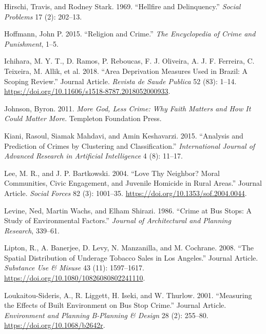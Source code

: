 \documentclass[smallextended]{svjour3}       %
\begin{document}
\leavevmode\hypertarget{ref-Hirschi1969hellfire}{}%
Hirschi, Travis, and Rodney Stark. 1969. ``Hellfire and Delinquency.''
\emph{Social Problems} 17 (2): 202--13.

\leavevmode\hypertarget{ref-Hoffmann2015religion}{}%
Hoffmann, John P. 2015. ``Religion and Crime.'' \emph{The Encyclopedia
of Crime and Punishment}, 1--5.

\leavevmode\hypertarget{ref-Ichihara2018area}{}%
Ichihara, M. Y. T., D. Ramos, P. Reboucas, F. J. Oliveira, A. J. F.
Ferreira, C. Teixeira, M. Allik, et al. 2018. ``Area Deprivation
Measures Used in Brazil: A Scoping Review.'' Journal Article.
\emph{Revista de Saude Publica} 52 (83): 1--14.
\url{https://doi.org/10.11606/s1518-8787.2018052000933}.

\leavevmode\hypertarget{ref-Johnson2011more}{}%
Johnson, Byron. 2011. \emph{More God, Less Crime: Why Faith Matters and
How It Could Matter More}. Templeton Foundation Press.

\leavevmode\hypertarget{ref-Kiani2015analysis}{}%
Kiani, Rasoul, Siamak Mahdavi, and Amin Keshavarzi. 2015. ``Analysis and
Prediction of Crimes by Clustering and Classification.''
\emph{International Journal of Advanced Research in Artificial
Intelligence} 4 (8): 11--17.

\leavevmode\hypertarget{ref-Lee2004love}{}%
Lee, M. R., and J. P. Bartkowski. 2004. ``Love Thy Neighbor? Moral
Communities, Civic Engagement, and Juvenile Homicide in Rural Areas.''
Journal Article. \emph{Social Forces} 82 (3): 1001--35.
\url{https://doi.org/10.1353/sof.2004.0044}.

\leavevmode\hypertarget{ref-Levine1986crime}{}%
Levine, Ned, Martin Wachs, and Elham Shirazi. 1986. ``Crime at Bus
Stops: A Study of Environmental Factors.'' \emph{Journal of
Architectural and Planning Research}, 339--61.

\leavevmode\hypertarget{ref-Lipton2008spatial}{}%
Lipton, R., A. Banerjee, D. Levy, N. Manzanilla, and M. Cochrane. 2008.
``The Spatial Distribution of Underage Tobacco Sales in Los Angeles.''
Journal Article. \emph{Substance Use \& Misuse} 43 (11): 1597--1617.
\url{https://doi.org/10.1080/10826080802241110}.

\leavevmode\hypertarget{ref-Loukaitou2001measuring}{}%
Loukaitou-Sideris, A., R. Liggett, H. Iseki, and W. Thurlow. 2001.
``Measuring the Effects of Built Environment on Bus Stop Crime.''
Journal Article. \emph{Environment and Planning B-Planning \& Design} 28
(2): 255--80. \url{https://doi.org/10.1068/b2642r}.
\end{document}
